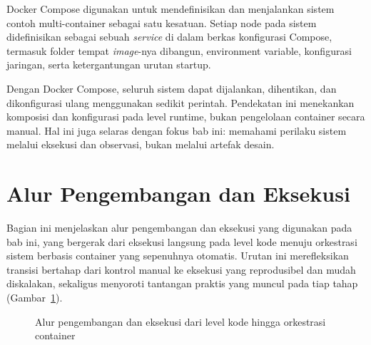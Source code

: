 Docker Compose digunakan untuk mendefinisikan dan menjalankan sistem contoh
multi-container sebagai satu kesatuan. Setiap node pada sistem didefinisikan
sebagai sebuah \emph{service} di dalam berkas konfigurasi Compose, termasuk
folder tempat \emph{image}-nya dibangun, environment variable, konfigurasi
jaringan, serta ketergantungan urutan startup.

Dengan Docker Compose, seluruh sistem dapat dijalankan, dihentikan, dan
dikonfigurasi ulang menggunakan sedikit perintah. Pendekatan ini menekankan
komposisi dan konfigurasi pada level runtime, bukan pengelolaan container secara
manual. Hal ini juga selaras dengan fokus bab ini: memahami perilaku sistem
melalui eksekusi dan observasi, bukan melalui artefak desain.

\section{Alur Pengembangan dan Eksekusi}

Bagian ini menjelaskan alur pengembangan dan eksekusi yang digunakan pada bab
ini, yang bergerak dari eksekusi langsung pada level kode menuju orkestrasi
sistem berbasis container yang sepenuhnya otomatis. Urutan ini merefleksikan
transisi bertahap dari kontrol manual ke eksekusi yang reprodusibel dan mudah
diskalakan, sekaligus menyoroti tantangan praktis yang muncul pada tiap tahap
(Gambar~\ref{fig:development-execution-flow}).

\begin{figure}[htbp]
\centering
{}
\caption{Alur pengembangan dan eksekusi dari level kode hingga orkestrasi container}
\label{fig:development-execution-flow}
\end{figure}

